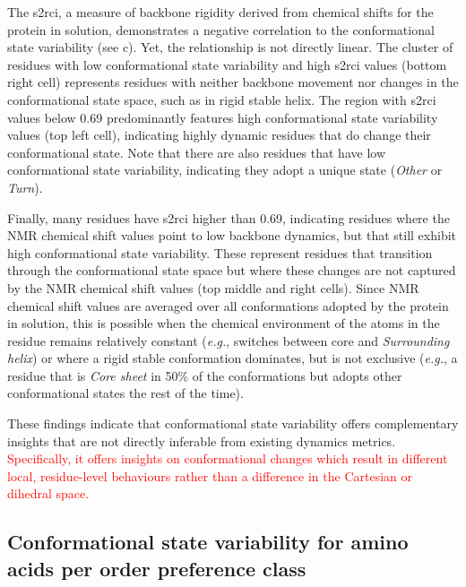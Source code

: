 The \gls{s2rci}, a measure of backbone rigidity derived from chemical shifts for the protein in solution, demonstrates a negative correlation to the conformational state variability (see  c). Yet, the relationship is not directly linear. The cluster of residues with low conformational state variability and high \gls{s2rci} values (bottom right cell) represents residues with neither backbone movement nor changes in the conformational state space, such as in rigid stable helix. The region with \gls{s2rci} values below 0.69 predominantly features high conformational state variability values (top left cell), indicating highly dynamic residues that do change their conformational state. Note that there are also residues that have low conformational state variability, indicating they adopt a unique state (\textit{Other} or \textit{Turn}).

Finally, many residues have \gls{s2rci} higher than 0.69, indicating residues where the NMR chemical shift values point to low backbone dynamics, but that still exhibit high conformational state variability. These represent residues that transition through the conformational state space but where these changes are not captured by the NMR chemical shift values (top middle and right cells). Since NMR chemical shift values are averaged over all conformations adopted by the protein in solution, this is possible when the chemical environment of the atoms in the residue remains relatively constant (\textit{e.g.}, switches between core and \textit{Surrounding helix}) or where a rigid stable conformation dominates, but is not exclusive (\textit{e.g.}, a residue that is \textit{Core sheet} in 50\% of the conformations but adopts other conformational states the rest of the time). 

These findings indicate that conformational state variability offers complementary insights that are not directly inferable from existing dynamics metrics. \textcolor{red}{Specifically, it offers insights on conformational changes which result in different local, residue-level behaviours rather than a difference in the Cartesian or dihedral space.}

\subsection{Conformational state variability for amino acids per order preference class} \label{section:aa_preference}

